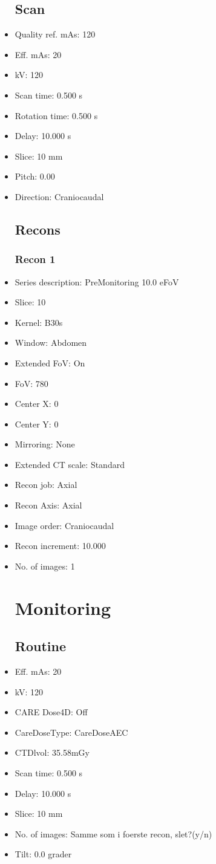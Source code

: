 \documentclass[12pt]{article}
\begin{document}
\begin{itemize}
\subsection{Scan}
\item Quality ref. mAs: 120\item Eff. mAs: 20\item kV: 120\item Scan time: 0.500 s\item Rotation time: 0.500 s\item Delay: 10.000 s\item Slice: 10 mm\item Pitch: 0.00\item Direction: Craniocaudal\subsection{Recons}

\subsubsection{Recon 1}
\item Series description: PreMonitoring 10.0 eFoV
\item Slice: 10
\item Kernel: B30s
\item Window: Abdomen
\item Extended FoV: On
\item FoV: 780
\item Center X: 0
\item Center Y: 0
\item Mirroring: None
\item Extended CT scale: Standard
\item Recon job: Axial
\item Recon Axis: Axial
\item Image order: Craniocaudal
\item Recon increment: 10.000
\item No. of images: 1
\section{Monitoring}
\subsection{Routine}
\item Eff. mAs: 20\item kV: 120\item CARE Dose4D: Off\item CareDoseType: CareDoseAEC\item CTDlvol: 35.58mGy\item Scan time: 0.500 s\item Delay: 10.000 s\item Slice: 10 mm\item No. of images: Samme som i foerste recon, slet?(y/n)\item Tilt: 0.0 grader

\end{itemize}
\end{document}
